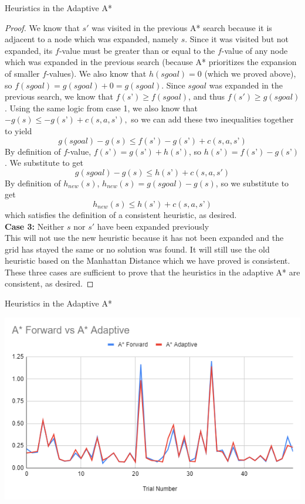 \documentclass[12pt]{article}
\theoremstyle{definition}
\begin{document}
\begin{onehalfspacing}
\begin{section}{Heuristics in the Adaptive A*}
\begin{proof}
We know that $s'$ was visited in the previous A* search because it is adjacent to a node which was expanded, namely $s$. Since it was visited but not expanded, its $f$-value must be greater than or equal to the $f$-value of any node which was expanded in the previous search (because A* prioritizes the expansion of smaller $f$-values). We also know that $h(sgoal) = 0$ (which we proved above), so $f(sgoal) = g(sgoal) + 0 = g(sgoal)$. Since $sgoal$ was expanded in the previous search, we know that $f(s’) \geq f(sgoal)$, and thus $f(s') \geq g(sgoal)$. Using the same logic from case 1, we also know that $-g(s) \leq -g(s’) + c(s, a, s’),$ so we can add these two inequalities together to yield
\begin{equation*}
    g(sgoal) - g(s) \leq f(s’) - g(s’) + c(s, a, s’)
\end{equation*}
By definition of $f$-value, $f(s’) = g(s’) + h(s’)$, so $h(s’) = f(s’) - g(s’)$. We substitute to get
\begin{equation*}
    g(sgoal) - g(s) \leq h(s’) + c(s, a, s')
\end{equation*}
By definition of $h_{new}(s)$, $h_{new}(s) = g(sgoal) -g(s)$, so we substitute to get
\begin{equation*}
    h_{new}(s)\leq h(s’) + c(s, a, s’)
\end{equation*}
which satisfies the definition of a consistent heuristic, as desired.\\[0.5em]
\textbf{Case 3:} Neither $s$ nor $s'$ have been expanded previously\\
This will not use the new heuristic because it has not been expanded and the grid has stayed the same or no solution was found. It will still use the old heuristic based on the Manhattan Distance which we have proved is consistent. \\[1em]
These three cases are sufficient to prove that the heuristics in the adaptive A* are consistent, as desired.
\end{proof}
\end{section}

\begin{section}{Heuristics in the Adaptive A*}

\includegraphics[scale=0.9]{images/Adaptive Experiment.png}


\end{section}
\end{onehalfspacing}
\end{document}
